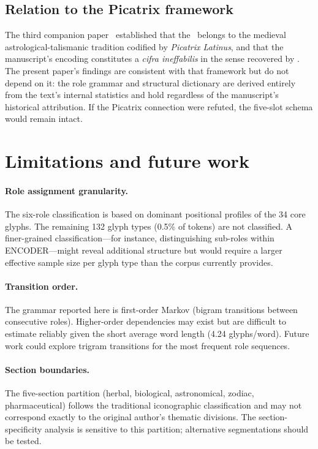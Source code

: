 \subsection{Relation to the Picatrix framework}

The third companion paper~\citep{jimenez2026venusring} established
that the \vms\ belongs to the medieval astrological-talismanic
tradition codified by \textit{Picatrix Latinus}, and that the
manuscript's encoding constitutes a \textit{cifra ineffabilis} in the
sense recovered by \citet{martinezgavilan2025}. The present paper's
findings are consistent with that framework but do not depend on it:
the role grammar and structural dictionary are derived entirely from
the text's internal statistics and hold regardless of the manuscript's
historical attribution. If the Picatrix connection were refuted, the
five-slot schema would remain intact.


\section{Limitations and future work}
\label{sec:limitations}

\paragraph{Role assignment granularity.}
The six-role classification is based on dominant positional profiles
of the 34 core glyphs. The remaining 132 glyph types (0.5\% of
tokens) are not classified. A finer-grained classification---for
instance, distinguishing sub-roles within ENCODER---might reveal
additional structure but would require a larger effective sample size
per glyph type than the corpus currently provides.

\paragraph{Transition order.}
The grammar reported here is first-order Markov (bigram transitions
between consecutive roles). Higher-order dependencies may exist but
are difficult to estimate reliably given the short average word
length (4.24 glyphs/word). Future work could explore trigram
transitions for the most frequent role sequences.

\paragraph{Section boundaries.}
The five-section partition (herbal, biological, astronomical, zodiac,
pharmaceutical) follows the traditional iconographic classification
and may not correspond exactly to the original author's thematic
divisions. The section-specificity analysis is sensitive to this
partition; alternative segmentations should be tested.

